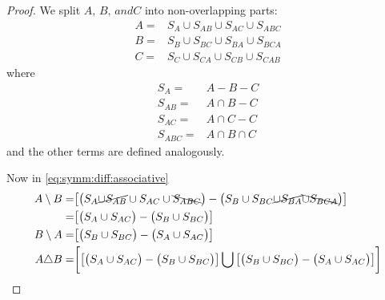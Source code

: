 \documentclass[]{article}
\begin{document}
\begin{appendices}
\begin{proof}
		We split $A,\,B,\, and C$ into non-overlapping parts:
		\begin{align*}
			A =& S_A \cup S_{AB} \cup S_{AC} \cup S_{ABC} \\
			B =& S_B \cup S_{BC} \cup S_{BA} \cup S_{BCA}\\
			C =& S_C \cup S_{CA} \cup S_{CB} \cup S_{CAB}
		\end{align*}
		where
		\begin{align*}
			S_A =& A - B - C\\
			S_{AB} =& A \cap B - C\\
			S_{AC} =& A \cap C - C\\
			S_{ABC} =& A \cap B \cap C 
		\end{align*}
		and the other terms are defined analogously.
		
		Now in \eqref{eq:symm:diff:associative}
		\begin{align*}
			A \setminus B =& \big[\big(S_A \cancel{\cup S_{AB}} \cup S_{AC} \cup \bcancel{S_{ABC}}\big) - \big(S_B \cup S_{BC} \cancel{\cup S_{BA}} \bcancel{\cup S_{BCA}}\big)\big]\\
			=& \big[\big(S_A  \cup S_{AC}\big) - \big(S_B \cup S_{BC} \big)\big]\\
			B \setminus A =& \big[\big(S_B  \cup S_{BC}\big) - \big(S_A \cup S_{AC} \big)\big]\\
			A \triangle B =& \bigg[\big[\big(S_A  \cup S_{AC}\big) - \big(S_B \cup S_{BC} \big)\big] \bigcup \big[\big(S_B  \cup S_{BC}\big) - \big(S_A \cup S_{AC} \big)\big]\bigg]
		\end{align*}
		

\end{proof}
\end{appendices}
\end{document}
